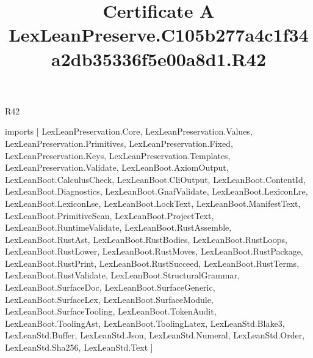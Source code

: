 \begin{lexlean}{R42}
\title{Certificate A LexLeanPreserve.C105b277a4c1f34a2db35336f5e00a8d1.R42}
\begin{coremodule}
imports [
  LexLeanPreservation.Core,
  LexLeanPreservation.Values,
  LexLeanPreservation.Primitives,
  LexLeanPreservation.Fixed,
  LexLeanPreservation.Keys,
  LexLeanPreservation.Templates,
  LexLeanPreservation.Validate,
  LexLeanBoot.AxiomOutput,
  LexLeanBoot.CalculusCheck,
  LexLeanBoot.CliOutput,
  LexLeanBoot.ContentId,
  LexLeanBoot.Diagnostics,
  LexLeanBoot.GnafValidate,
  LexLeanBoot.LexiconLre,
  LexLeanBoot.LexiconLse,
  LexLeanBoot.LockText,
  LexLeanBoot.ManifestText,
  LexLeanBoot.PrimitiveScan,
  LexLeanBoot.ProjectText,
  LexLeanBoot.RuntimeValidate,
  LexLeanBoot.RustAssemble,
  LexLeanBoot.RustAst,
  LexLeanBoot.RustBodies,
  LexLeanBoot.RustLoops,
  LexLeanBoot.RustLower,
  LexLeanBoot.RustMoves,
  LexLeanBoot.RustPackage,
  LexLeanBoot.RustPrint,
  LexLeanBoot.RustSucceed,
  LexLeanBoot.RustTerms,
  LexLeanBoot.RustValidate,
  LexLeanBoot.StructuralGrammar,
  LexLeanBoot.SurfaceDoc,
  LexLeanBoot.SurfaceGeneric,
  LexLeanBoot.SurfaceLex,
  LexLeanBoot.SurfaceModule,
  LexLeanBoot.SurfaceTooling,
  LexLeanBoot.TokenAudit,
  LexLeanBoot.ToolingAst,
  LexLeanBoot.ToolingLatex,
  LexLeanStd.Blake3,
  LexLeanStd.Buffer,
  LexLeanStd.Json,
  LexLeanStd.Numeral,
  LexLeanStd.Order,
  LexLeanStd.Sha256,
  LexLeanStd.Text
]


\end{coremodule}
\end{lexlean}
